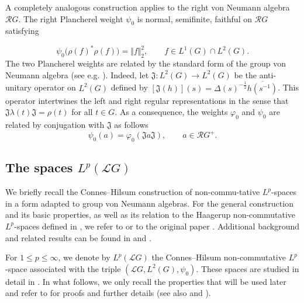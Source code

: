 \documentclass[12pt]{amsart}
\newcommand{\norm}[1]{\Vert#1\Vert}
\theoremstyle{remark}
\theoremstyle{definition}
\numberwithin{equation}{section}
\begin{document}
A completely analogous construction applies to the right von Neumann algebra \(\mathcal{R}G\). The right Plancherel weight \(\psi_0\) is normal, semifinite, faithful on \(\mathcal{R}G\) satisfying

$$
\psi_0\bigl(\rho(f)^*\rho(f)
\bigr) = \norm{f}_{2}^2,\qquad f\in L^1(G)\cap L^2(G).
$$
The two Plancherel weights are related by the standard form of the group von Neumann algebra (see e.g. \cite[Chapter 3]{Hiai}). Indeed,
let ${\mathfrak J}\colon L^2(G)\to L^2(G)$ be the 
anti-unitary operator on \(L^2(G)\) defined by 
$[{\mathfrak J}(h)](s)= \Delta(s)^{-\frac12}\overline{h(s^{-1})}$.  This operator intertwines the left and right regular representations in the sense that ${\mathfrak J}\lambda(t) {\mathfrak J}=\rho(t)$ for all $t\in G$. As a consequence, the weights \(\varphi_0\) and \(\psi_0\) are related by conjugation with \({\mathfrak J}\) as follows
\begin{equation}\label{2Conj}
\psi_0(a) = \varphi_0({\mathfrak J}a{\mathfrak J}),\qquad a\in {\mathcal R}G^+.
\end{equation}





\smallskip
\subsection{The spaces $L^p({\mathcal L}G)$}

We briefly recall the Connes–Hilsum construction of non-commu-\-tative $L^p$-spaces in a form adapted to group von Neumann algebras. %
For the general construction and its basic properties, as well as its relation to the Haagerup non-commutative $L^p$-spaces 
defined in \cite{H}, we refer to \cite[Section 11.3]{Hiai} or to the original paper \cite{Hil}. Additional background and related results can be found in \cite{Terp0} and \cite[Section 1]{HJX}.


For $1 \leq p \leq \infty$, we denote by $L^p({\mathcal L}G)$ the Connes–Hilsum non-commutative $L^p$-space associated with the triple
\( ({\mathcal L}G, L^2(G), \psi_0).
\)
These spaces are studied in detail in \cite{Terp2}. In what follows, we only recall the properties that will be used later and refer to \cite{Terp2} for proofs and further details (see also \cite[Chapter 11]{Hiai} and \cite{Vos}).
\end{document}
